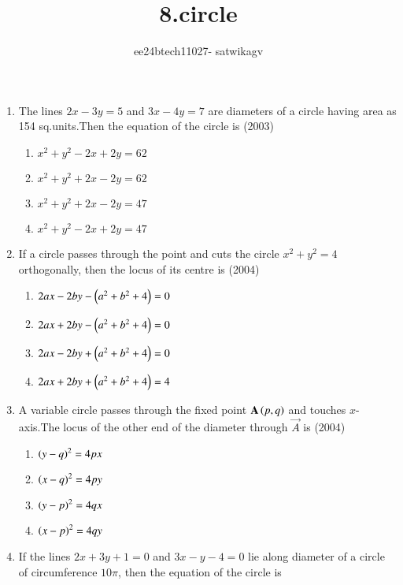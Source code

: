 \documentclass[journal,12pt,twocolumn]{IEEEtran}
\theoremstyle{remark}
\begin{document}

\vspace{3cm}

\title{8.circle}
\author{ee24btech11027- satwikagv}
\maketitle
\newpage
\bigskip

\renewcommand{\thefigure}{\theenumi}
\renewcommand{\thetable}{\theenumi}
 
\begin{enumerate}[start=6]
\item The lines $2x-3y=5$ and $3x-4y=7$ are diameters of a circle having area as 154 sq.units.Then the equation of the circle is
\hfill{(2003)}
\begin{enumerate}
\item $x^2+y^2-2x+2y=62$
\item $x^2+y^2+2x-2y=62$
\item $x^2+y^2+2x-2y=47$
\item $x^2+y^2-2x+2y=47$
\end{enumerate}
\item If a circle passes through the point  and cuts the circle $x^2+y^2=4$ orthogonally, then the locus of its centre is
\hfill{(2004)}
\begin{enumerate}
\item $2ax-2by-\left(a^2+b^2+4\right)=0$
\item $2ax+2by-\left(a^2+b^2+4\right)=0$
\item $2ax-2by+\left(a^2+b^2+4\right)=0$
\item $2ax+2by+\left(a^2+b^2+4\right)=4$
\end{enumerate}
\item A variable circle passes through the fixed point $\mathbf{A}\left(p,q\right)$ and touches $x$-axis.The locus of the other end of the diameter through $\vec{A}$ is
\hfill{(2004)}
\begin{multicols}{2}
\begin{enumerate}
\item $\left(y-q\right)^2=4px$
\item $\left(x-q\right)^2=4py$ 
\item $\left(y-p\right)^2=4qx$
\item $\left(x-p\right)^2=4qy$
\end{enumerate}
\end{multicols}
\item If the lines $2x+3y+1=0$ and $3x-y-4=0$ lie along diameter of a circle of circumference $10\pi$, then the equation of the circle is 

\end{enumerate}
\end{document}
